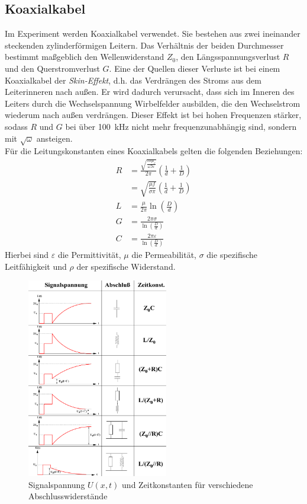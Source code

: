 \subsection{Koaxialkabel}
Im Experiment werden Koaxialkabel verwendet. Sie bestehen aus zwei ineinander steckenden zylinderförmigen Leitern. Das Verhältnis der beiden Durchmesser bestimmt maßgeblich den Wellenwiderstand $Z_0$, den Längsspannungsverlust $R$ und den Querstromverlust $G$. Eine der Quellen dieser Verluste ist bei einem Koaxialkabel der \textit{Skin-Effekt}, d.h. das Verdrängen des Stroms aus dem Leiterinneren nach außen. Er wird dadurch verursacht, dass sich im Inneren des Leiters durch die Wechselspannung Wirbelfelder ausbilden, die den Wechselstrom wiederum nach außen verdrängen. Dieser Effekt ist bei hohen Frequenzen stärker, sodass $R$ und $G$ bei über \SI{100}{\kilo\hertz} nicht mehr frequenzunabhängig sind, sondern mit $\sqrt{\omega}$ ansteigen. \\
Für die Leitungskonstanten eines Koaxialkabels gelten die folgenden Beziehungen:
\begin{align}\label{eq:RLCTheorie}
	R &= \frac{\sqrt{\frac{\pi\nu\mu_c}{\omega\Im{\varepsilon}}}}{2\pi}\left(\frac{1}{d}+\frac{1}{D}\right) \\
	&= \sqrt{\frac{\mu f}{\sigma\pi}}\left(\frac{1}{d}+\frac{1}{D}\right) \\
	L &= \frac{\mu}{2\pi}\ln(\frac{D}{d}) \\
	G &= \frac{2\pi\sigma}{\ln(\frac{D}{d})} \\
	C &= \frac{2\pi\varepsilon}{\ln(\frac{D}{d})}
\end{align}
Hierbei sind $\varepsilon$ die Permittivität, $\mu$ die Permeabilität, $\sigma$ die spezifische Leitfähigkeit und $\rho$ der spezifische Widerstand.
\begin{figure}[h]
	\centering
	\includegraphics[width=0.55\textwidth]{Zeitkonstante.pdf}
	\caption{Signalspannung $U(x,t)$ und Zeitkonstanten für verschiedene Abschlusswiderstände \cite{E2}}
	\label{fig:Zeitkonstanten}
\end{figure}
